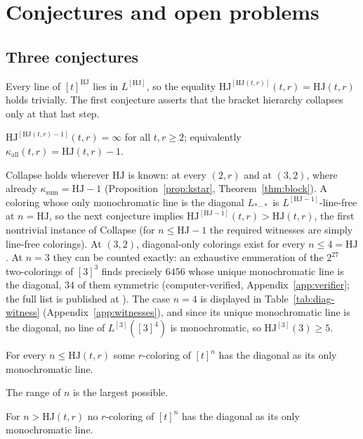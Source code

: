 \documentclass[12pt]{article}
\newcommand{\HJ}{\mathrm{HJ}}
\newcommand{\Ls}{L}
\newcommand{\ksum}{\kappa_{\mathrm{sum}}}
\newcommand{\kall}{\kappa_{\mathrm{all}}}
\begin{document}
\section{Conjectures and open problems}\label{sec:open}

\subsection{Three conjectures}

Every line of $[t]^{\HJ}$ lies in $\Ls^{[\HJ]}$, so the equality
$\HJ^{[\HJ(t,r)]}(t,r)=\HJ(t,r)$ holds trivially. The first conjecture
asserts that the bracket hierarchy collapses only at that last step.

\begin{conjecture}[Collapse]\label{conj:collapse}
$\HJ^{[\HJ(t,r)-1]}(t,r)=\infty$ for all $t,r\ge 2$; equivalently
$\kall(t,r)=\HJ(t,r)-1$.
\end{conjecture}

Collapse holds wherever $\HJ$ is known: at every $(2,r)$ and at
$(3,2)$, where already $\ksum=\HJ-1$ (Proposition~\ref{prop:kstar},
Theorem~\ref{thm:block}). A coloring whose only monochromatic line is
the diagonal $\Ls_{*\cdots *}$ is $\Ls^{[\HJ-1]}$-line-free at $n=\HJ$,
so the next conjecture implies $\HJ^{[\HJ-1]}(t,r)>\HJ(t,r)$, the first
nontrivial instance of Collapse (for $n\le\HJ-1$ the required witnesses
are simply line-free colorings). At $(3,2)$, diagonal-only colorings
exist for every $n\le 4=\HJ$ \cite{thesis}. At $n=3$ they can be
counted exactly: an exhaustive enumeration of the $2^{27}$
two-colorings of $[3]^{3}$ finds precisely $6456$ whose unique
monochromatic line is the diagonal, $34$ of them symmetric
(computer-verified, Appendix~\ref{app:verifier}; the full list is
published at \cite{hjcerts}). The case $n=4$ is displayed in
Table~\ref{tab:diag-witness} (Appendix~\ref{app:witnesses}), and since
its unique monochromatic line is the diagonal, no line of
$\Ls^{[3]}([3]^{4})$ is monochromatic, so $\HJ^{[3]}(3)\ge 5$.

\begin{conjecture}\label{conj:diag}
For every $n\le\HJ(t,r)$ some $r$-coloring of $[t]^{n}$ has the
diagonal as its only monochromatic line.
\end{conjecture}

The range of $n$ is the largest possible.

\begin{proposition}\label{prop:diag-max}
For $n>\HJ(t,r)$ no $r$-coloring of $[t]^{n}$ has the diagonal as its
only monochromatic line.
\end{proposition}
\end{document}
